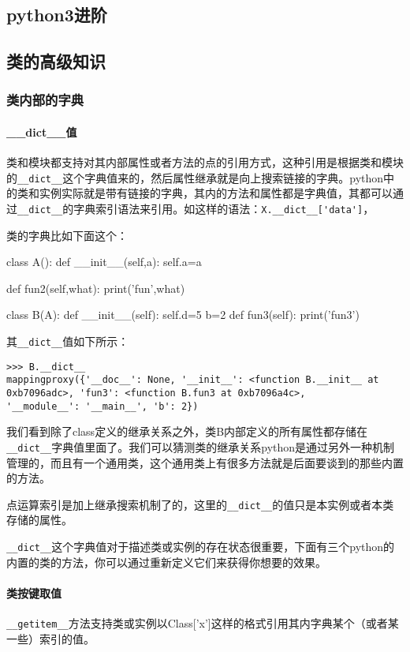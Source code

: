 \documentclass[12pt,oneside]{book}
\begin{document}
\begin{common-format}
\part{python3进阶}
\chapter{类的高级知识}
\label{sec:类的高级知识}
\section{类内部的字典}
\subsection{\_{}\_{}dict\_{}\_{}值}
类和模块都支持对其内部属性或者方法的点的引用方式，这种引用是根据类和模块的\verb+__dict__+这个字典值来的，然后属性继承就是向上搜索链接的字典。python中的类和实例实际就是带有链接的字典，其内的方法和属性都是字典值，其都可以通过\verb+__dict__+的字典索引语法来引用。如这样的语法：\verb+X.__dict__['data']+，

类的字典比如下面这个：
\begin{tcbpython}[]
class A():
    def __init__(self,a):
        self.a=a

    def fun2(self,what):
        print('fun',what)

class B(A):
    def __init__(self):
        self.d=5
    b=2
    def fun3(self):
        print('fun3')
\end{tcbpython}
其\verb+__dict__+值如下所示：
\begin{Verbatim}
>>> B.__dict__
mappingproxy({'__doc__': None, '__init__': <function B.__init__ at 
0xb7096adc>, 'fun3': <function B.fun3 at 0xb7096a4c>, 
'__module__': '__main__', 'b': 2})
\end{Verbatim}

我们看到除了class定义的继承关系之外，类B内部定义的所有属性都存储在\verb+__dict__+字典值里面了。我们可以猜测类的继承关系python是通过另外一种机制管理的，而且有一个通用类，这个通用类上有很多方法就是后面要谈到的那些内置的方法。

点运算索引是加上继承搜索机制了的，这里的\verb+__dict__+的值只是本实例或者本类存储的属性。

\verb+__dict__+这个字典值对于描述类或实例的存在状态很重要，下面有三个python的内置的类的方法，你可以通过重新定义它们来获得你想要的效果。

\subsection{类按键取值}
\verb+__getitem__+方法支持类或实例以Class['x']这样的格式引用其内字典某个（或者某一些）索引的值。




\end{common-format}
\end{document}
